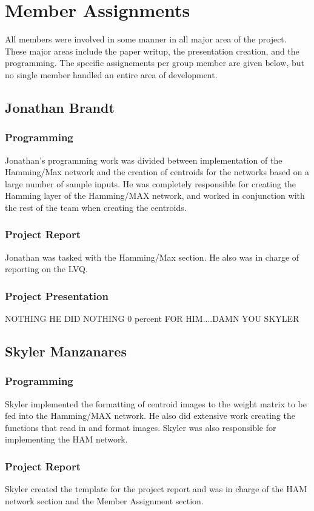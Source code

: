 \documentclass{article}
\begin{document}
 
\section{Member Assignments}
All members were involved in some manner in all major area of the project. These
major areas include the paper writup, the presentation creation, and the 
programming. The specific assignements per group member are given below, but no
single member handled an entire area of development.
\subsection{Jonathan Brandt}
\subsubsection{Programming}
Jonathan's programming work was divided between implementation of the 
Hamming/Max network and the creation of centroids for the networks based on a
large number of sample inputs. He was completely responsible for creating the Hamming layer of the Hamming/MAX network, and worked in conjunction with the rest of the team when creating the centroids. 

\subsubsection{Project Report}
Jonathan was tasked with the Hamming/Max section. He also was in charge of reporting on the LVQ.

\subsubsection{Project Presentation}
NOTHING HE DID NOTHING 0 percent FOR HIM....DAMN YOU SKYLER

\subsection{Skyler Manzanares}

\subsubsection{Programming}
Skyler implemented the formatting of centroid images to the weight matrix to be fed into the Hamming/MAX network. He also did extensive work creating the functions that read in and format images. Skyler was also responsible for implementing
the HAM network.

\subsubsection{Project Report}
Skyler created the template for the project report and was in charge of the HAM 
network section and the Member Assignment section.
\end{document}
